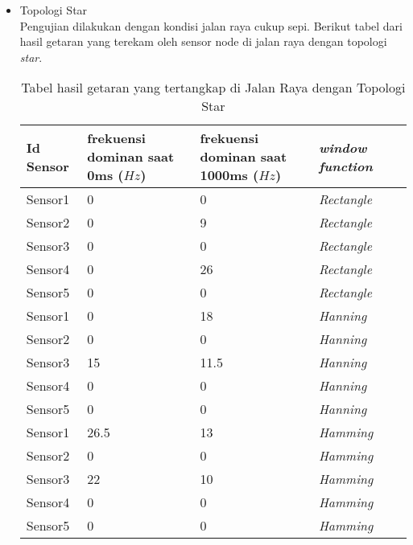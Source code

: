\begin{itemize}
\item Topologi Star\\
Pengujian dilakukan dengan kondisi jalan raya cukup sepi. Berikut tabel dari hasil getaran yang terekam oleh sensor node di jalan raya dengan topologi {\it star}.

\begin{table}[H]
    \centering
    \caption{Tabel hasil getaran yang tertangkap di Jalan Raya dengan Topologi Star}
    \begin{tabular}{|p{3cm}|p{3cm}|p{3cm}|p{3cm}|p{3cm}|}
    \hline Id Sensor & frekuensi dominan saat 0ms ($Hz$)& frekuensi dominan saat 1000ms ($Hz$)& {\it window function}\\
    \hline Sensor1 & 0 & 0 & {\it Rectangle} \\
    \hline Sensor2 & 0 & 9 & {\it Rectangle} \\
    \hline Sensor3 & 0 & 0 & {\it Rectangle} \\
    \hline Sensor4 & 0 & 26 & {\it Rectangle} \\
    \hline Sensor5 & 0 & 0 & {\it Rectangle} \\
    \hline Sensor1 & 0 & 18 & {\it Hanning} \\
    \hline Sensor2 & 0 & 0 & {\it Hanning} \\
    \hline Sensor3 & 15 & 11.5 & {\it Hanning} \\
    \hline Sensor4 & 0 & 0 & {\it Hanning} \\
    \hline Sensor5 & 0 & 0 & {\it Hanning} \\
    \hline Sensor1 & 26.5 & 13 & {\it Hamming} \\
    \hline Sensor2 & 0 & 0 & {\it Hamming} \\
    \hline Sensor3 & 22 & 10 & {\it Hamming} \\
    \hline Sensor4 & 0 & 0 & {\it Hamming} \\
    \hline Sensor5 & 0 & 0 & {\it Hamming} \\
    \hline
    \end{tabular}
    \label{tab:starRoadResult}
\end{table}



\end{itemize}
